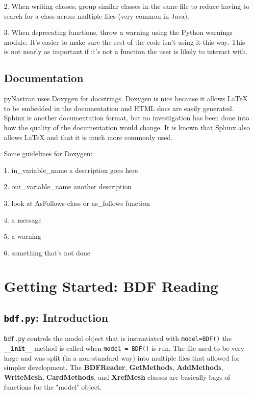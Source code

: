      2.  When writing classes, group similar classes in the same file to reduce having to search for a class across multiple files (very common in Java).

     3.  When deprecating functions, throw a warning using the Python warnings module.  It's easier to make sure the rest of the code isn't using it this way.  This is not nearly as important if it's not a function the user is likely to interact with.

 \subsection{Documentation}
     pyNastran uses Doxygen for docstrings.  Doxygen is nice because it allows LaTeX to be embedded in the documentation and HTML docs are easily generated.  Sphinx is another documentation format, but no investigation has been done into how the quality of the documentation would change.  It is known that Sphinx also allows LaTeX and that it is much more commonly used.

    Some guidelines for Doxygen:

     1.  \@param  in\_variable\_name a description goes here

     2.  \@retval out\_variable\_name another description

     3.  \@see    look at AsFollows class or as\_follows function

     4.  \@note   a message

     5.  \@warning a warning

     6.  \@todo   something that's not done
     
     

\section{Getting Started: BDF Reading}
 \subsection{{\tt bdf.py}:  Introduction}
     {\tt bdf.py} controls the model object that is instantiated with      {\tt model=BDF()} the {\bf \tt \_\_init\_\_} method is called when {\tt model = BDF()} is run.  The file used to be very large and was split (in a non-standard way) into multiple files that allowed for simpler development.  The {\bf BDFReader}, {\bf GetMethods}, {\bf AddMethods}, {\bf WriteMesh},
     {\bf CardMethods}, and {\bf XrefMesh} classes are basically bags of functions for the "model" object.
     
